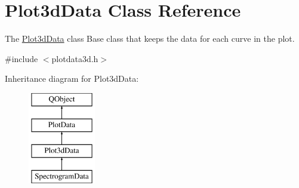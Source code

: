 \hypertarget{class_plot3d_data}{\section{Plot3d\-Data Class Reference}
\label{class_plot3d_data}
}


The \hyperlink{class_plot3d_data}{Plot3d\-Data} class Base class that keeps the data for each curve in the plot.  




{\ttfamily \#include $<$plotdata3d.\-h$>$}

Inheritance diagram for Plot3d\-Data\-:\begin{figure}[H]
\begin{center}
\leavevmode
\includegraphics[height=4.000000cm]{class_plot3d_data}
\end{center}
\end{figure}
